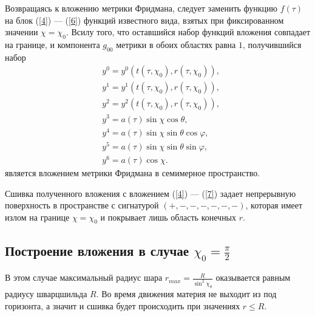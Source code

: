 \documentclass[12pt]{article}
\begin{document}
Возвращаясь к вложению метрики Фридмана, следует заменить функцию $f(\tau)$ на блок (\ref{4}) --- (\ref{6}) функций известного вида, взятых при фиксированном значении $\chi = \chi_0$. Всилу того, что оставшийся набор функций вложения совпадает на границе, и компонента $g_{00}$ метрики в обоих областях равна $1$, получившийся набор
\begin{align}
	&y^0 = y^0(t(\tau, \chi_0), r(\tau, \chi_0)), \\
	&y^1 = y^1(t(\tau, \chi_0), r(\tau, \chi_0)), \\
	&y^2 = y^2(t(\tau, \chi_0), r(\tau, \chi_0)), \\
	&y^3 = a(\tau) \sin{\chi} \cos{\theta}, \\
	&y^4 = a(\tau) \sin{\chi} \sin{\theta} \cos{\varphi}, \\
	&y^5 = a(\tau) \sin{\chi} \sin{\theta} \sin{\varphi}, \\
	&y^6 = a(\tau) \cos{\chi}.
\end{align}
является вложением метрики Фридмана в семимерное пространство. 

Сшивка полученного вложения с вложением (\ref{4}) --- (\ref{7}) задает непрерывную поверхность в пространстве с сигнатурой $(+, -, -, -, -, -, -)$, которая имеет излом на границе  $\chi = \chi_0$ и покрывает лишь область конечных $r$. 

\subsection{ Построение вложения в случае $\chi_0 = \frac{\pi}{2}$}

В этом случае максимальный радиус шара $r_{max} = \frac{R}{\sin^2{\chi_0}}$ оказывается равным радиусу шварцшильда $R$. Во время движения материя не выходит из под горизонта, а значит и сшивка будет происходить при значениях $r \leqslant R$.
\end{document}
